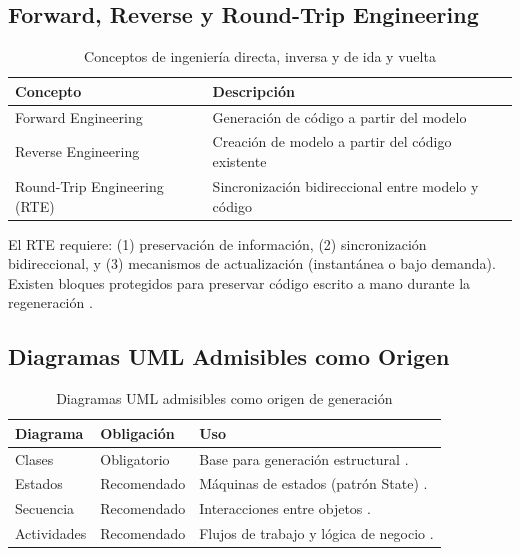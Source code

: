 \documentclass[journal,onecolumn]{IEEEtran}
\begin{document}
\subsection{Forward, Reverse y Round-Trip Engineering}

\begin{table}[H]
	\centering
	\caption{Conceptos de ingeniería directa, inversa y de ida y vuelta}
	\label{tab:forward-reverse-rte}
	\begin{tabular}{|l|p{9cm}|}
		\hline
		\textbf{Concepto} & \textbf{Descripción} \\
		\hline
		Forward Engineering & Generación de código a partir del modelo \\
		\hline
		Reverse Engineering & Creación de modelo a partir del código existente \\
		\hline
		Round-Trip Engineering (RTE) & Sincronización bidireccional entre modelo y código \\
		\hline
	\end{tabular}
\end{table}

El RTE requiere: (1) preservación de información, (2) sincronización bidireccional, y (3) mecanismos de actualización (instantánea o bajo demanda). Existen bloques protegidos para preservar código escrito a mano durante la regeneración \cite{Rosca2021, Almutairi2022}.

\subsection{Diagramas UML Admisibles como Origen}

\begin{table}[H]
	\centering
	\caption{Diagramas UML admisibles como origen de generación}
	\label{tab:diagramas-admisibles}
	\begin{tabular}{|l|l|p{6cm}|}
		\hline
		\textbf{Diagrama} & \textbf{Obligación} & \textbf{Uso} \\
		\hline
		Clases & Obligatorio & Base para generación estructural \cite{Rosca2021, Kim2024}. \\
		\hline
		Estados & Recomendado & Máquinas de estados (patrón State) \cite{Rosca2021, Kim2024}. \\
		\hline
		Secuencia & Recomendado & Interacciones entre objetos \cite{Rosca2021, Kim2024}. \\
		\hline
		Actividades & Recomendado & Flujos de trabajo y lógica de negocio \cite{Rosca2021, Kim2024}. \\
		\hline
	\end{tabular}
\end{table}
\end{document}
